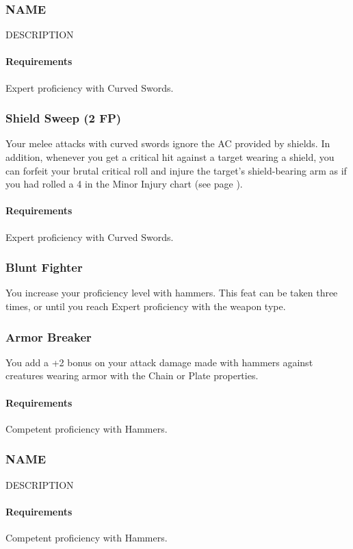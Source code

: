 \subsubsection{NAME} \label{feat::name}
    DESCRIPTION
    \paragraph{Requirements} Expert proficiency with Curved Swords.
\subsubsection{Shield Sweep (2 FP)} \label{feat::shieldsweep}
    Your melee attacks with curved swords ignore the AC provided by shields.
    In addition, whenever you get a critical hit against a target wearing a shield, you can forfeit your brutal critical roll and injure the target's shield-bearing arm as if you had rolled a 4 in the Minor Injury chart (see page \pageref{ssec::injuriesandinsanity}).
    \paragraph{Requirements} Expert proficiency with Curved Swords.
\subsubsection{Blunt Fighter} \label{feat::bluntfighter}
    You increase your proficiency level with hammers.
    This feat can be taken three times, or until you reach Expert proficiency with the weapon type.
\subsubsection{Armor Breaker} \label{feat::armorbreaker}
    You add a +2 bonus on your attack damage made with hammers against creatures wearing armor with the Chain or Plate properties.
    \paragraph{Requirements} Competent proficiency with Hammers.
\subsubsection{NAME} \label{feat::name}
    DESCRIPTION
    \paragraph{Requirements} Competent proficiency with Hammers.

